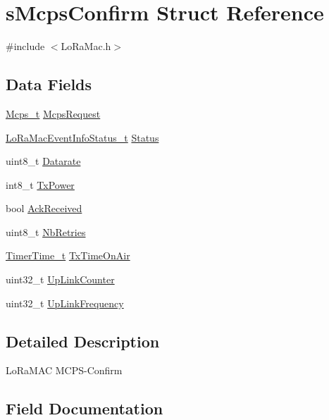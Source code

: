 \hypertarget{structsMcpsConfirm}{}\section{s\+Mcps\+Confirm Struct Reference}
\label{structsMcpsConfirm}


{\ttfamily \#include $<$Lo\+Ra\+Mac.\+h$>$}

\subsection*{Data Fields}
\begin{DoxyCompactItemize}
\item 
\hyperlink{group__LORAMAC_ga670d0c87a52aeb13391f303a4cf94f00}{Mcps\+\_\+t} \hyperlink{structsMcpsConfirm_af7f36d1afe5416d9395ffcce12f62145}{Mcps\+Request}
\item 
\hyperlink{group__LORAMAC_gac6ffc346a4c767f7a743c87a686c51b4}{Lo\+Ra\+Mac\+Event\+Info\+Status\+\_\+t} \hyperlink{structsMcpsConfirm_a4e10bb1a3159c6c0fafb1d59dee1fc2a}{Status}
\item 
uint8\+\_\+t \hyperlink{structsMcpsConfirm_a673d186fe97ac6903d84ea06d1af76e4}{Datarate}
\item 
int8\+\_\+t \hyperlink{structsMcpsConfirm_ac81b90f3a15873d1485c670630150637}{Tx\+Power}
\item 
bool \hyperlink{structsMcpsConfirm_ad6244d42c26dee6fe360c70f51742c8a}{Ack\+Received}
\item 
uint8\+\_\+t \hyperlink{structsMcpsConfirm_a6939fdebdf1c09cde31514f87c72a0ce}{Nb\+Retries}
\item 
\hyperlink{utilities_8h_a4215ca43d3e953099ea758ce428599d0}{Timer\+Time\+\_\+t} \hyperlink{structsMcpsConfirm_add2498113d2f3fd0826f535883142de7}{Tx\+Time\+On\+Air}
\item 
uint32\+\_\+t \hyperlink{structsMcpsConfirm_abb52e1ad49ee429c734e8cc8da2128b5}{Up\+Link\+Counter}
\item 
uint32\+\_\+t \hyperlink{structsMcpsConfirm_a7baa3086fabcc4735bf6ee92b533455d}{Up\+Link\+Frequency}
\end{DoxyCompactItemize}


\subsection{Detailed Description}
Lo\+Ra\+M\+AC M\+C\+P\+S-\/\+Confirm 

\subsection{Field Documentation}
\mbox{\label{structsMcpsConfirm_ad6244d42c26dee6fe360c70f51742c8a}} 
